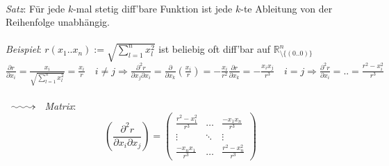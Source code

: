 \documentclass[12pt,a4paper,titlepage]{article}
\makeatletter
\newcommand{\longsquiggly}{\xymatrix{{}\ar@{~>}[r]&{}}}
\renewcommand{\d}{\partial}
\newcommand{\setR}{\mathbb{R}}
\makeatother
\begin{document}
\\
\textit{Satz}: Für jede $k$-mal stetig diff'bare Funktion ist jede $k$-te Ableitung von der Reihenfolge unabhängig. \\
\\
\textit{Beispiel}: $r(x_1..x_n):=\sqrt{\sum_{l=1}^n x_l^2}$ ist beliebig oft diff'bar auf $\setR^n_{\setminus\{(0..0)\}}$ \\
$\frac{\d r}{\d x_i}=\frac{x_i}{\sqrt{\sum_{l=1}^n x_l^2}}=\frac{x_i}{r} \quad i\neq j\Rightarrow \frac{\d^2r}{\d x_j\d x_i}=\frac{\d}{\d x_k}(\frac{x_i}{r})=-\frac{x_i}{r^2}\frac{\d r}{\d x_k}=-\frac{x_ix_j}{r^3} \quad i=j\Rightarrow \frac{\d^2r}{\d x_i}=..=\frac{r^2-x_i^2}{r^3}$ \\
\\
$\longsquiggly$ \textit{Matrix}: \\
$$\left(\frac{\d^2r}{\d x_i\d x_j}\right)=\begin{pmatrix}
  \frac{r^2-x_1^2}{r^3} & \hdots & \frac{-x_1x_n}{r^3} \\
  \vdots & \ddots & \vdots \\
  \frac{-x_nx_1}{r^3} & \hdots & \frac{r^2-x_n^2}{r^3}
\end{pmatrix}$$
\end{document}
